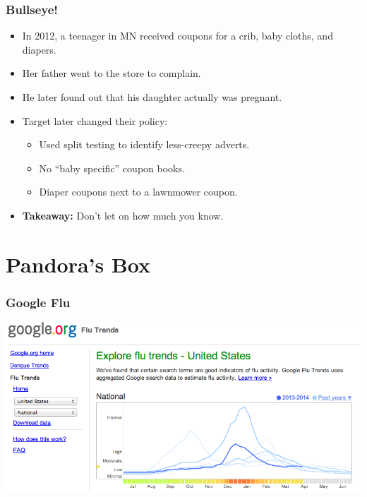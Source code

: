 \documentclass{beamer}
\begin{document}
\begin{frame}
	\frametitle{Bullseye!}
	\begin{itemize}
        \item<1-> In 2012, a teenager in MN received coupons for a crib, baby cloths, and diapers.
        \item<2-> Her father went to the store to complain.
        \item<3-> He later found out that his daughter actually was pregnant.
        \item<4-> Target later changed their policy:
        \begin{itemize}
            \item<4-> Used split testing to identify less-creepy adverts.
            \item<4-> No ``baby specific'' coupon books.
            \item<4-> Diaper coupons next to a lawnmower coupon.
        \end{itemize}
        \item<5->\textbf{Takeaway:}  Don't let on how much you know.
    \end{itemize}
\end{frame}


\section{Pandora's Box}
\begin{frame}
	\frametitle{Google Flu}
    \begin{center}
        \includegraphics[width=0.9\hsize]{art/google_flu}
    \end{center}
\end{frame}

\end{document}
